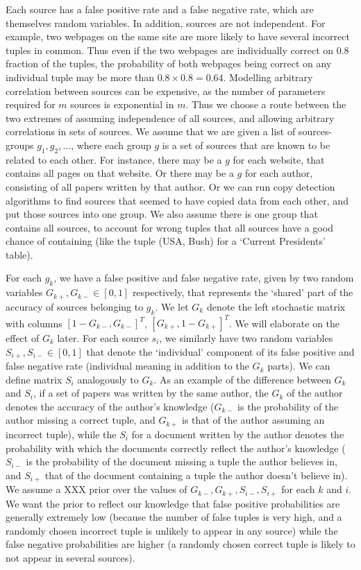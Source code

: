 \documentclass{sig-alternate}
\newcounter{prob}
\begin{document}
Each source has a false positive rate and a false negative rate, which are themselves random variables. In addition, sources are not independent. For example, two webpages on the same site are more likely to have several incorrect tuples in common. Thus even if the two webpages are individually correct on $0.8$ fraction of the tuples, the probability of both webpages being correct on any individual tuple may be more than $0.8 \times 0.8 = 0.64$. Modelling arbitrary correlation between sources can be expensive, as the number of parameters required for $m$ sources is exponential in $m$. Thus we choose a route between the two extremes of assuming independence of all sources, and allowing arbitrary correlations in sets of sources. We assume that we are given a list of sources-groups $g_1, g_2, ...$, where each group $g$ is a set of sources that are known to be related to each other. For instance, there may be a $g$ for each website, that contains all pages on that website. Or there may be a $g$ for each author, consisting of all papers written by that author. Or we can run copy detection algorithms to find sources that seemed to have copied data from each other, and put those sources into one group. We also assume there is one group that contains all sources, to account for wrong tuples that all sources have a good chance of containing (like the tuple (USA, Bush) for a `Current Presidents' table).

For each $g_k$, we have a false positive and false negative rate, given by two random variables $G_{k+},G_{k-} \in [0,1]$ respectively, that represents the `shared' part of the accuracy of sources belonging to $g_k$. We let $G_k$ denote the left stochastic matrix with columns $[1-G_{k-},G_{k-}]^T$, $[G_{k+},1-G_{k+}]^T$. We will elaborate on the effect of $G_k$ later. For each source $s_i$, we similarly have two random variables $S_{i+},S_{i-} \in [0,1]$ that denote the `individual' component of its false positive and false negative rate (individual meaning in addition to the $G_k$ parts). We can define matrix $S_i$ analogously to $G_k$. As an example of the difference between $G_k$ and $S_i$, if a set of papers was written by the same author, the $G_k$ of the author denotes the accuracy of the author's knowledge ($G_{k-}$ is the probability of the author missing a correct tuple, and $G_{k+}$ is that of the author assuming an incorrect tuple), while the $S_i$ for a document written by the author denotes the probability with which the documents correctly reflect the author's knowledge ($S_{i-}$ is the probability of the document missing a tuple the author believes in, and $S_{i+}$ that of the document containing a tuple the author doesn't believe in). We assume a XXX prior over the values of $G_{k-}, G_{k+}, S_{i-}, S_{i+}$ for each $k$ and $i$. We want the prior to reflect our knowledge that false positive probabilities are generally extremely low (because the number of false tuples is very high, and a randomly chosen incorrect tuple is unlikely to appear in any source) while the false negative probabilities are higher (a randomly chosen correct tuple is likely to not appear in several sources).
\end{document}
